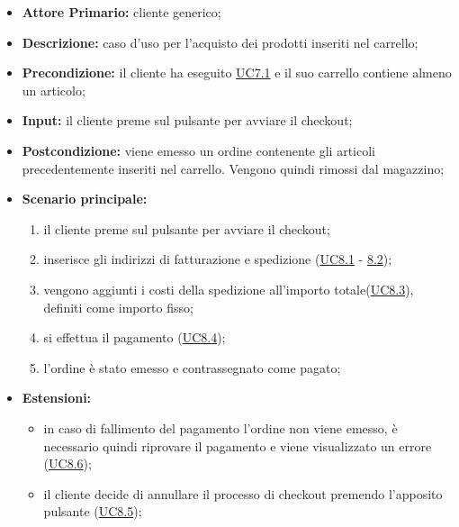 \begin{itemize}
    \item \textbf{Attore Primario:} cliente generico;
    \item \textbf{Descrizione:} caso d'uso per l'acquisto dei prodotti inseriti nel carrello;
    \item \textbf{Precondizione:} il cliente ha eseguito \hyperref[UC7.1]{UC7.1} e il suo carrello contiene almeno un articolo;
    \item \textbf{Input:} il cliente preme sul pulsante per avviare il checkout;
    \item \textbf{Postcondizione:} viene emesso un ordine contenente gli articoli precedentemente inseriti nel carrello. Vengono quindi rimossi dal magazzino;
    \item \textbf{Scenario principale:}
    \begin{enumerate}
        \item il cliente preme sul pulsante per avviare il checkout;
        \item inserisce gli indirizzi di fatturazione e spedizione (\hyperref[UC8.1]{UC8.1} - \hyperref[UC8.2]{8.2});
        \item vengono aggiunti i costi della spedizione all'importo totale(\hyperref[UC8.3]{UC8.3}), definiti come importo fisso;
        \item si effettua il pagamento (\hyperref[UC8.4]{UC8.4});
        \item l'ordine è stato emesso e contrassegnato come pagato;
    \end{enumerate}
    \item \textbf{Estensioni:}
    \begin{itemize}
        \item in caso di fallimento del pagamento l'ordine non viene emesso, è necessario quindi riprovare il pagamento e viene visualizzato un errore (\hyperref[UC8.6]{UC8.6});
        \item il cliente decide di annullare il processo di checkout premendo l'apposito pulsante (\hyperref[UC8.5]{UC8.5});
    \end{itemize}
\end{itemize}

\stepsubUserCase
